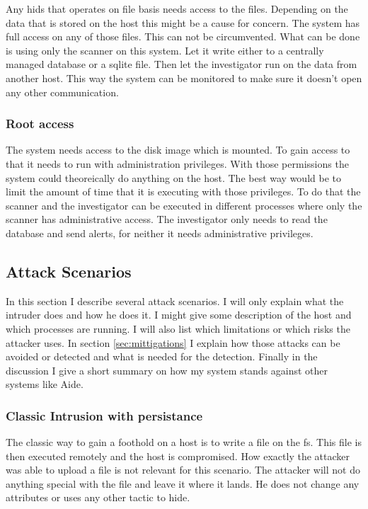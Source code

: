 \documentclass[
	a4paper,					%
	10pt,							%
	twoside,					%
	openright,				%
	notitlepage,			%
	parskip=half,			%
]{scrreprt}					%
\begin{document}
Any \gls{hids} that operates on file basis needs access to the files. Depending on the data that is stored on the host this might be a cause for concern. The system has full access on any of those files. This can not be circumvented. What can be done is using only the scanner on this system. Let it write either to a centrally managed database or a sqlite file. Then let the investigator run on the data from another host. This way the system can be monitored to make sure it doesn't open any other communication.

\subsubsection{Root access}
\label{sec:risk:root}

The system needs access to the disk image which is mounted. To gain access to that it needs to run with administration privileges. With those permissions the system could theoreically do anything on the host. The best way would be to limit the amount of time that it is executing with those privileges. To do that the scanner and the investigator can be executed in different processes where only the scanner has administrative access. The investigator only needs to read the database and send alerts, for neither it needs administrative privileges.

\subsection{Attack Scenarios}
\label{sec:attack_scenarios}

In this section I describe several attack scenarios. I will only explain what the intruder does and how he does it. I might give some description of the host and which processes are running. I will also list which limitations or which risks the attacker uses. In section \ref{sec:mittigations} I explain how those attacks can be avoided or detected and what is needed for the detection. Finally in the discussion I give a short summary on how my system stands against other systems like Aide. 

\subsubsection{Classic Intrusion with persistance}
\label{sec:attack:classic}

The classic way to gain a foothold on a host is to write a file on the \gls{fs}. This file is then executed remotely and the host is compromised. How exactly the attacker was able to upload a file is not relevant for this scenario. The attacker will not do anything special with the file and leave it where it lands. He does not change any attributes or uses any other tactic to hide.
\end{document}
